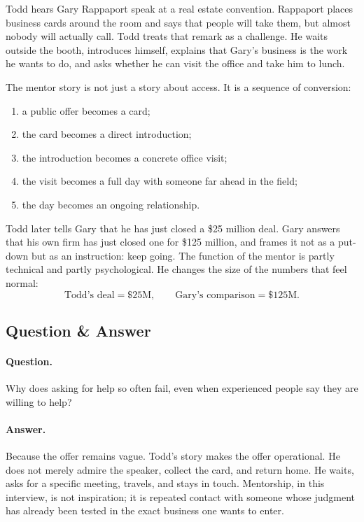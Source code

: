 Todd hears Gary Rappaport speak at a real estate convention. Rappaport places business cards around the room and says that people will take them, but almost nobody will actually call. Todd treats that remark as a challenge. He waits outside the booth, introduces himself, explains that Gary's business is the work he wants to do, and asks whether he can visit the office and take him to lunch.

The mentor story is not just a story about access. It is a sequence of conversion:
\begin{enumerate}
\item a public offer becomes a card;
\item the card becomes a direct introduction;
\item the introduction becomes a concrete office visit;
\item the visit becomes a full day with someone far ahead in the field;
\item the day becomes an ongoing relationship.
\end{enumerate}

Todd later tells Gary that he has just closed a \$25 million deal. Gary answers that his own firm has just closed one for \$125 million, and frames it not as a put-down but as an instruction: keep going. The function of the mentor is partly technical and partly psychological. He changes the size of the numbers that feel normal:
\begin{equation}
\text{Todd's deal}=\$25\mathrm{M},
\qquad
\text{Gary's comparison}=\$125\mathrm{M}.
\end{equation}

\subsection{Question \& Answer}

\paragraph{Question.}
Why does asking for help so often fail, even when experienced people say they are willing to help?

\paragraph{Answer.}
Because the offer remains vague. Todd's story makes the offer operational. He does not merely admire the speaker, collect the card, and return home. He waits, asks for a specific meeting, travels, and stays in touch. Mentorship, in this interview, is not inspiration; it is repeated contact with someone whose judgment has already been tested in the exact business one wants to enter.

